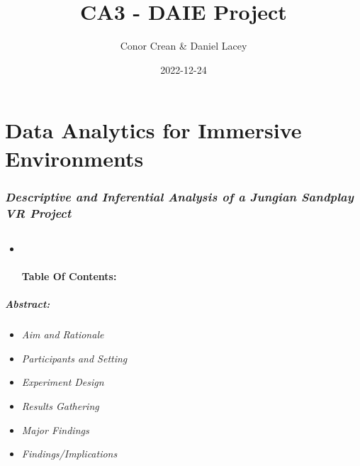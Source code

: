 \documentclass[
]{article}
\title{CA3 - DAIE Project}
\author{Conor Crean \& Daniel Lacey}
\date{2022-12-24}
\providecommand{\tightlist}{%
  \setlength{\itemsep}{0pt}\setlength{\parskip}{0pt}}
\begin{document}
\maketitle

{
\setcounter{tocdepth}{2}
\tableofcontents
}
\newpage

\hypertarget{data-analytics-for-immersive-environments}{%
\section{\texorpdfstring{\textbf{Data Analytics for Immersive
Environments}}{Data Analytics for Immersive Environments}}\label{data-analytics-for-immersive-environments}}

\hypertarget{descriptive-and-inferential-analysis-of-a-jungian-sandplay-vr-project}{%
\subsubsection{\texorpdfstring{\emph{Descriptive and Inferential
Analysis of a Jungian Sandplay VR
Project}}{Descriptive and Inferential Analysis of a Jungian Sandplay VR Project}}\label{descriptive-and-inferential-analysis-of-a-jungian-sandplay-vr-project}}

\hypertarget{section}{%
\subsection{\texorpdfstring{\newpage}{}}\label{section}}

\begin{itemize}
\item ~
  \hypertarget{table-of-contents}{%
  \paragraph{\texorpdfstring{\textbf{Table Of
  Contents:}}{Table Of Contents:}}\label{table-of-contents}}
\end{itemize}

\hypertarget{abstract}{%
\subparagraph{\texorpdfstring{\emph{Abstract:}}{Abstract:}}\label{abstract}}

\begin{itemize}
\tightlist
\item
  \emph{Aim and Rationale}
\item
  \emph{Participants and Setting}
\item
  \emph{Experiment Design}
\item
  \emph{Results Gathering}
\item
  \emph{Major Findings}
\item
  \emph{Findings/Implications}
\end{itemize}
\end{document}
